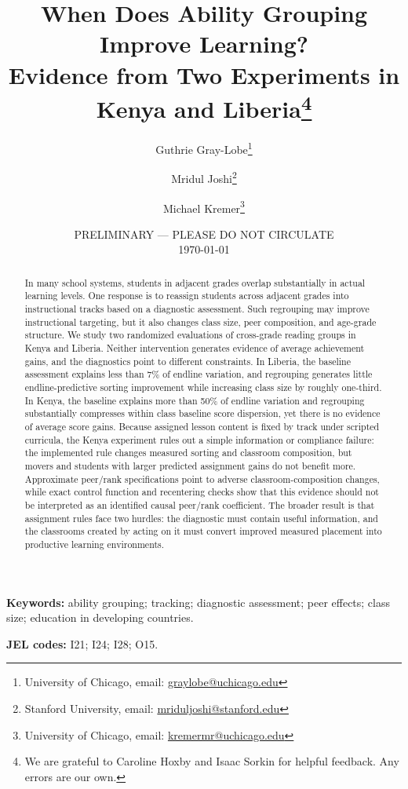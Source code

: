 \documentclass[11pt]{article}
\title{When Does Ability Grouping Improve Learning? \\ Evidence from Two Experiments in Kenya and Liberia\footnote{We are grateful to Caroline Hoxby and Isaac Sorkin for helpful feedback. Any errors are our own.}}
\newif\ifpublicversion
\begin{document}
\begin{titlepage}
\author{Guthrie Gray-Lobe\thanks{University of Chicago, email: \protect\href{mailto:graylobe@uchicago.edu}{graylobe@uchicago.edu}} \and Mridul Joshi\thanks{Stanford University, email: \protect\href{mailto:mriduljoshi@stanford.edu}{mriduljoshi@stanford.edu}} \and Michael Kremer\thanks{University of Chicago, email: \protect\href{mailto:kremermr@uchicago.edu}{kremermr@uchicago.edu}}}

\ifpublicversion
\date{\today}
\else
\date{PRELIMINARY --- PLEASE DO NOT CIRCULATE \\ \today}
\fi
\maketitle

\begin{abstract}\noindent
In many school systems, students in adjacent grades overlap substantially in actual learning levels. One response is to reassign students across adjacent grades into instructional tracks based on a diagnostic assessment. Such regrouping may improve instructional targeting, but it also changes class size, peer composition, and age-grade structure. We study two randomized evaluations of cross-grade reading groups in Kenya and Liberia. Neither intervention generates evidence of average achievement gains, and the diagnostics point to different constraints. In Liberia, the baseline assessment explains less than 7\% of endline variation, and regrouping generates little endline-predictive sorting improvement while increasing class size by roughly one-third. In Kenya, the baseline explains more than 50\% of endline variation and regrouping substantially compresses within class baseline score dispersion, yet there is no evidence of average score gains. Because assigned lesson content is fixed by track under scripted curricula, the Kenya experiment rules out a simple information or compliance failure: the implemented rule changes measured sorting and classroom composition, but movers and students with larger predicted assignment gains do not benefit more. Approximate peer/rank specifications point to adverse classroom-composition changes, while exact control function and recentering checks show that this evidence should not be interpreted as an identified causal peer/rank coefficient. The broader result is that assignment rules face two hurdles: the diagnostic must contain useful information, and the classrooms created by acting on it must convert improved measured placement into productive learning environments.

\end{abstract}
\vspace{0.5em}
\noindent \textbf{Keywords:} ability grouping; tracking; diagnostic assessment; peer effects; class size; education in developing countries.

\noindent \textbf{JEL codes:} I21; I24; I28; O15.
\setcounter{page}{0}
\thispagestyle{empty}
\end{titlepage}
\doublespacing
\end{document}
